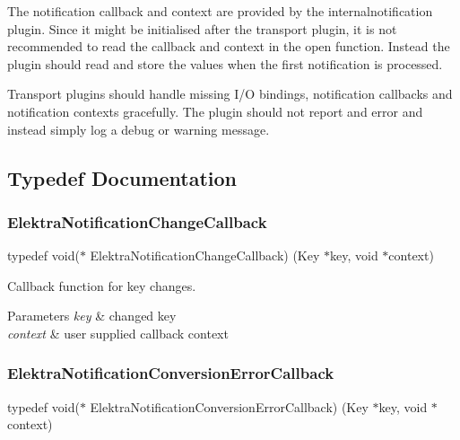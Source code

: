 The notification callback and context are provided by the {\ttfamily internalnotification} plugin. Since it might be initialised after the transport plugin, it is not recommended to read the callback and context in the {\ttfamily open} function. Instead the plugin should read and store the values when the first notification is processed.

Transport plugins should handle missing I/O bindings, notification callbacks and notification contexts gracefully. The plugin should not report and error and instead simply log a debug or warning message. 

\subsection{Typedef Documentation}
\mbox{\label{group__kdbnotification_gad0d800e32a72d89780321e5723301eb9}} 
\subsubsection{\texorpdfstring{Elektra\+Notification\+Change\+Callback}{ElektraNotificationChangeCallback}}
{\footnotesize\ttfamily typedef void($\ast$ Elektra\+Notification\+Change\+Callback) (Key $\ast$key, void $\ast$context)}



Callback function for key changes. 


\begin{DoxyParams}{Parameters}
{\em key} & changed key \\
\hline
{\em context} & user supplied callback context \\
\hline
\end{DoxyParams}
\mbox{\label{group__kdbnotification_gaad19fb981cad906eb9c72bd602c7bb64}} 
\subsubsection{\texorpdfstring{Elektra\+Notification\+Conversion\+Error\+Callback}{ElektraNotificationConversionErrorCallback}}
{\footnotesize\ttfamily typedef void($\ast$ Elektra\+Notification\+Conversion\+Error\+Callback) (Key $\ast$key, void $\ast$context)}



